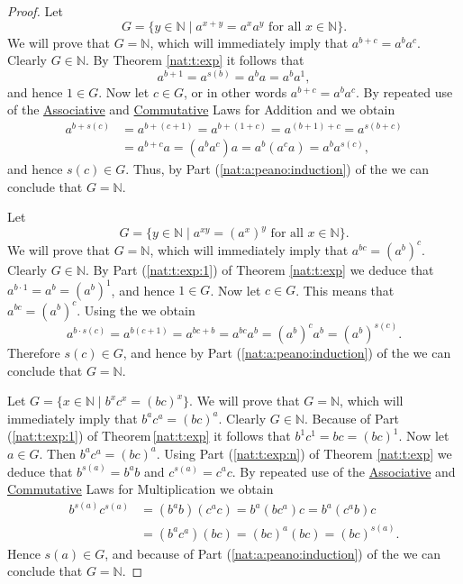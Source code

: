 \begin{proof}
	\hfill

	Let
	\[
		G = \{ y \in \mathbb{N} \mid  a^{x + y} = a^x a^y \text{ for all } x \in \mathbb{N} \}.
	\]
	We will prove that $G = \mathbb{N}$, which will immediately imply that $a^{b + c} = a^b a^c$. Clearly $G \in \mathbb{N}$. By Theorem \ref{nat:t:exp} it follows that
	\[
		a^{b + 1} = a^{s(b)} = a^b a = a^b a^1,
	\]
	and hence $1 \in G$. Now let $c \in G$, or in other words $a^{b + c} = a^b a^c$. By repeated use of the \hyperref[nat:t:props:associative_add]{Associative} and \hyperref[nat:t:props:commutative_add]{Commutative} Laws for Addition and  we obtain
	\begin{align*}
		a^{b + s(c)} & = a^{b + (c + 1)} = a^{b + (1 + c)} = a^{(b + 1) + c} = a^{s(b + c)} \\
		             & = a^{b + c} a  = (a^b a^c)a = a^b (a^c a) = a^b a^{s(c)},
	\end{align*}
	and hence $s(c) \in G$. Thus, by Part (\ref{nat:a:peano:induction}) of the  we can conclude that $G = \mathbb{N}$.

	Let
	\[
		G = \{ y \in \mathbb{N} \mid  a^{x y} = (a^x)^y \text{ for all } x \in \mathbb{N} \}.
	\]
	We will prove that $G = \mathbb{N}$, which will immediately imply that $a^{b c} = (a^b)^c$. Clearly $G \in \mathbb{N}$. By Part (\ref{nat:t:exp:1}) of Theorem \ref{nat:t:exp} we deduce that $a^{b \cdot 1} = a^b = (a^b)^1$, and hence $1 \in G$. Now let $c \in G$. This means that $a^{b c} = (a^b)^c$. Using the  we obtain
	\[
		a^{b \cdot s(c)} = a^{b(c + 1)} = a^{b c + b} = a^{b c} a^b = (a^b)^c a^b = (a^b)^{s(c)}.
	\]
	Therefore $s(c) \in G$, and hence by Part (\ref{nat:a:peano:induction}) of the  we can conclude that $G = \mathbb{N}$.

	Let $G = \{ x \in \mathbb{N} \mid  b^x c^x = (b c)^x \}$. We will prove that $G = \mathbb{N}$, which will immediately imply that $b^a c^a = (b c)^a$. Clearly $G \in \mathbb{N}$. Because of Part (\ref{nat:t:exp:1}) of Theorem\,\ref{nat:t:exp} it follows that $b^1 c^1 = b c = (b c)^1$. Now let $a \in G$. Then $b^a c^a = (b c)^a$. Using Part (\ref{nat:t:exp:n}) of Theorem \ref{nat:t:exp} we deduce that $b^{s(a)} = b^a b$ and $c^{s(a)} = c^a c$. By repeated use of the \hyperref[nat:t:props:associative_mult]{Associative} and \hyperref[nat:t:props:commutative_mult]{Commutative} Laws for Multiplication we obtain
	\begin{align*}
		b^{s(a)} c^{s(a)} & = (b^a b)(c^a c) = b^a (b c^a) c = b^a (c^a b) c \\
		                  & = (b^a c^a)(b c) = (b c)^a (b c) = (b c)^{s(a)}.
	\end{align*}
	Hence $s(a) \in G$, and because of Part (\ref{nat:a:peano:induction}) of the  we can conclude that $G = \mathbb{N}$.
\end{proof}
